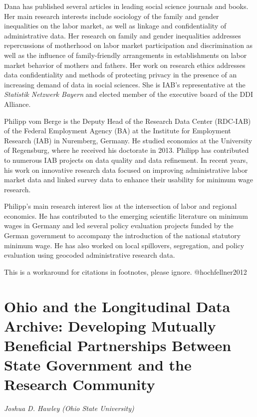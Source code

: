 \documentclass[
]{book}
\begin{document}
Dana has published several articles in leading social science journals and books. Her main research interests include sociology of the family and gender inequalities on the labor market, as well as linkage and confidentiality of administrative data. Her research on family and gender inequalities addresses repercussions of motherhood on labor market participation and discrimination as well as the influence of family-friendly arrangements in establishments on labor market behavior of mothers and fathers. Her work on research ethics addresses data confidentiality and methods of protecting privacy in the presence of an increasing demand of data in social sciences. She is IAB's representative at the \emph{Statistik Netzwerk Bayern} and elected member of the executive board of the DDI Alliance.

Philipp vom Berge is the Deputy Head of the Research Data Center (RDC-IAB) of the Federal Employment Agency (BA) at the Institute for Employment Research (IAB) in Nuremberg, Germany. He studied economics at the University of Regensburg, where he received his doctorate in 2013. Philipp has contributed to numerous IAB projects on data quality and data refinement. In recent years, his work on innovative research data focused on improving administrative labor market data and linked survey data to enhance their usability for minimum wage research.

Philipp's main research interest lies at the intersection of labor and regional economics. He has contributed to the emerging scientific literature on minimum wages in Germany and led several policy evaluation projects funded by the German government to accompany the introduction of the national statutory minimum wage. He has also worked on local spillovers, segregation, and policy evaluation using geocoded administrative research data.

\begin{invisible}
This is a workaround for citations in footnotes, please ignore.
@hochfellner2012
\end{invisible}

\hypertarget{olda}{%
\chapter{Ohio and the Longitudinal Data Archive: Developing Mutually Beneficial Partnerships Between State Government and the Research Community}\label{olda}}

\emph{Joshua D. Hawley (Ohio State University)}
\end{document}
